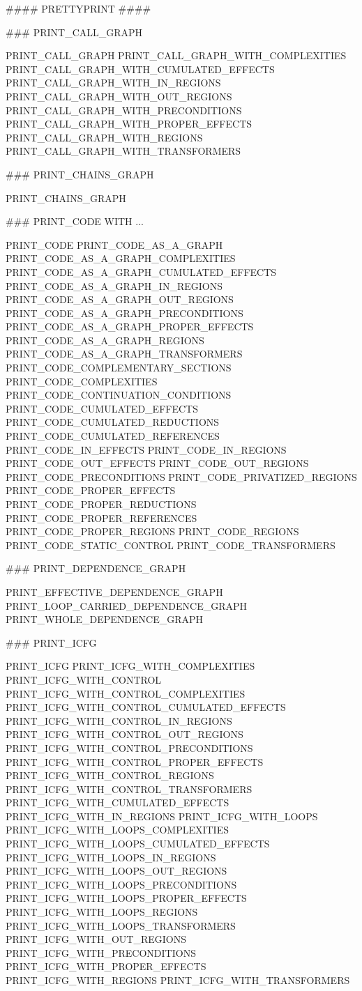 \documentclass[a4paper,12pt]{article}
\begin{document}
\begin{verbatim*}
#### PRETTYPRINT #### 

### PRINT_CALL_GRAPH                          

PRINT_CALL_GRAPH                          
PRINT_CALL_GRAPH_WITH_COMPLEXITIES        
PRINT_CALL_GRAPH_WITH_CUMULATED_EFFECTS   
PRINT_CALL_GRAPH_WITH_IN_REGIONS          
PRINT_CALL_GRAPH_WITH_OUT_REGIONS         
PRINT_CALL_GRAPH_WITH_PRECONDITIONS       
PRINT_CALL_GRAPH_WITH_PROPER_EFFECTS      
PRINT_CALL_GRAPH_WITH_REGIONS             
PRINT_CALL_GRAPH_WITH_TRANSFORMERS        

### PRINT_CHAINS_GRAPH                        

PRINT_CHAINS_GRAPH                        

### PRINT_CODE  WITH ...                             

PRINT_CODE                                
PRINT_CODE_AS_A_GRAPH                     
PRINT_CODE_AS_A_GRAPH_COMPLEXITIES        
PRINT_CODE_AS_A_GRAPH_CUMULATED_EFFECTS   
PRINT_CODE_AS_A_GRAPH_IN_REGIONS          
PRINT_CODE_AS_A_GRAPH_OUT_REGIONS         
PRINT_CODE_AS_A_GRAPH_PRECONDITIONS       
PRINT_CODE_AS_A_GRAPH_PROPER_EFFECTS      
PRINT_CODE_AS_A_GRAPH_REGIONS             
PRINT_CODE_AS_A_GRAPH_TRANSFORMERS        
PRINT_CODE_COMPLEMENTARY_SECTIONS         
PRINT_CODE_COMPLEXITIES                   
PRINT_CODE_CONTINUATION_CONDITIONS        
PRINT_CODE_CUMULATED_EFFECTS              
PRINT_CODE_CUMULATED_REDUCTIONS           
PRINT_CODE_CUMULATED_REFERENCES           
PRINT_CODE_IN_EFFECTS                     
PRINT_CODE_IN_REGIONS                     
PRINT_CODE_OUT_EFFECTS                    
PRINT_CODE_OUT_REGIONS
PRINT_CODE_PRECONDITIONS
PRINT_CODE_PRIVATIZED_REGIONS
PRINT_CODE_PROPER_EFFECTS
PRINT_CODE_PROPER_REDUCTIONS
PRINT_CODE_PROPER_REFERENCES
PRINT_CODE_PROPER_REGIONS
PRINT_CODE_REGIONS
PRINT_CODE_STATIC_CONTROL
PRINT_CODE_TRANSFORMERS

### PRINT_DEPENDENCE_GRAPH

PRINT_EFFECTIVE_DEPENDENCE_GRAPH
PRINT_LOOP_CARRIED_DEPENDENCE_GRAPH
PRINT_WHOLE_DEPENDENCE_GRAPH

### PRINT_ICFG

PRINT_ICFG
PRINT_ICFG_WITH_COMPLEXITIES
PRINT_ICFG_WITH_CONTROL
PRINT_ICFG_WITH_CONTROL_COMPLEXITIES
PRINT_ICFG_WITH_CONTROL_CUMULATED_EFFECTS
PRINT_ICFG_WITH_CONTROL_IN_REGIONS
PRINT_ICFG_WITH_CONTROL_OUT_REGIONS
PRINT_ICFG_WITH_CONTROL_PRECONDITIONS
PRINT_ICFG_WITH_CONTROL_PROPER_EFFECTS
PRINT_ICFG_WITH_CONTROL_REGIONS
PRINT_ICFG_WITH_CONTROL_TRANSFORMERS
PRINT_ICFG_WITH_CUMULATED_EFFECTS
PRINT_ICFG_WITH_IN_REGIONS
PRINT_ICFG_WITH_LOOPS
PRINT_ICFG_WITH_LOOPS_COMPLEXITIES
PRINT_ICFG_WITH_LOOPS_CUMULATED_EFFECTS
PRINT_ICFG_WITH_LOOPS_IN_REGIONS
PRINT_ICFG_WITH_LOOPS_OUT_REGIONS
PRINT_ICFG_WITH_LOOPS_PRECONDITIONS
PRINT_ICFG_WITH_LOOPS_PROPER_EFFECTS
PRINT_ICFG_WITH_LOOPS_REGIONS
PRINT_ICFG_WITH_LOOPS_TRANSFORMERS
PRINT_ICFG_WITH_OUT_REGIONS
PRINT_ICFG_WITH_PRECONDITIONS
PRINT_ICFG_WITH_PROPER_EFFECTS
PRINT_ICFG_WITH_REGIONS
PRINT_ICFG_WITH_TRANSFORMERS


\end{verbatim*}
\end{document}
